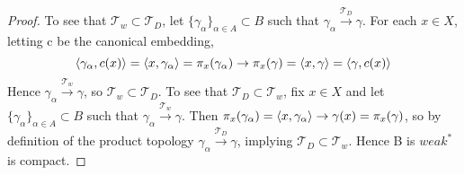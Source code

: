 \begin{thm}
\begin{proof}
        To see that $\mathcal{T}_w \subset \mathcal{T}_D$, let $\{\gamma_\alpha\}_{\alpha \in A} \subset B$ such that $\gamma_\alpha \overset{\mathcal{T}_D}{\to} \gamma$. For each $x \in X$, letting c be the canonical embedding, 
        \begin{equation}
            \left\langle \gamma_{\alpha}, c(x) \right\rangle= \left\langle x,\gamma_\alpha \right\rangle = \pi_x(\gamma_\alpha) \to \pi_x(\gamma) = \left\langle x,\gamma \right\rangle = \left\langle \gamma, c(x) \right\rangle
        \end{equation}
        Hence $\gamma_\alpha \overset{\mathcal{T}_w}{\to} \gamma$, so $\mathcal{T}_w \subset \mathcal{T}_D$.  
        To see that $\mathcal{T}_D \subset \mathcal{T}_w$, fix $x\in X$ and let $\{\gamma_\alpha\}_{\alpha \in A} \subset B$ such that $\gamma_\alpha \overset{\mathcal{T}_w}{\to} \gamma$. 
        Then $\pi_x(\gamma_\alpha) = \left\langle x,\gamma_\alpha \right\rangle \to \gamma(x) = \pi_x(\gamma)$, so by definition of the product topology $\gamma_\alpha \overset{\mathcal{T}_D}{\to} \gamma$, implying $\mathcal{T}_D \subset \mathcal{T}_w$.  Hence B is $weak^{*}$ is compact. 
    \end{proof}
\end{thm} 


